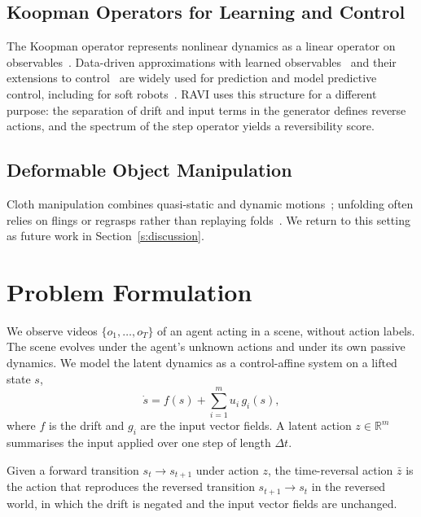 \documentclass{jcse}
\newcommand{\method}{RAVI}
\newcommand{\zb}{\bar{z}}
\newcommand{\R}{\mathbb{R}}
\begin{document}
\subsection{Koopman Operators for Learning and Control}
The Koopman operator represents nonlinear dynamics as a linear operator on observables~\cite{koopman1931,mezic2005spectral}.
Data-driven approximations with learned observables~\cite{lusch2018deep} and their extensions to control~\cite{korda2018koopman,bruder2021bilinear,brunton2022modern} are widely used for prediction and model predictive control, including for soft robots~\cite{bruder2019soft}.
{\method} uses this structure for a different purpose: the separation of drift and input terms in the generator defines reverse actions, and the spectrum of the step operator yields a reversibility score.

\subsection{Deformable Object Manipulation}
Cloth manipulation combines quasi-static and dynamic motions~\cite{lin2020softgym,lin2021vcd}; unfolding often relies on flings or regrasps rather than replaying folds~\cite{ha2021flingbot,avigal2022speedfolding}.
We return to this setting as future work in Section~\ref{s:discussion}.

\section{Problem Formulation} \label{s:problem}

We observe videos $\{o_1,\dots,o_T\}$ of an agent acting in a scene, without action labels.
The scene evolves under the agent's unknown actions and under its own passive dynamics.
We model the latent dynamics as a control-affine system on a lifted state $s$,
\begin{equation}
\dot{s}=f(s)+\sum_{i=1}^m u_i\,g_i(s),
\label{e:cas}
\end{equation}
where $f$ is the drift and $g_i$ are the input vector fields.
A latent action $z\in\R^m$ summarises the input applied over one step of length $\Delta t$.

\begin{definition}
\label{d:trev}
Given a forward transition $s_t\to s_{t+1}$ under action $z$, the time-reversal action $\zb$ is the action that reproduces the reversed transition $s_{t+1}\to s_t$ in the reversed world, in which the drift is negated and the input vector fields are unchanged.
\end{definition}
\end{document}
